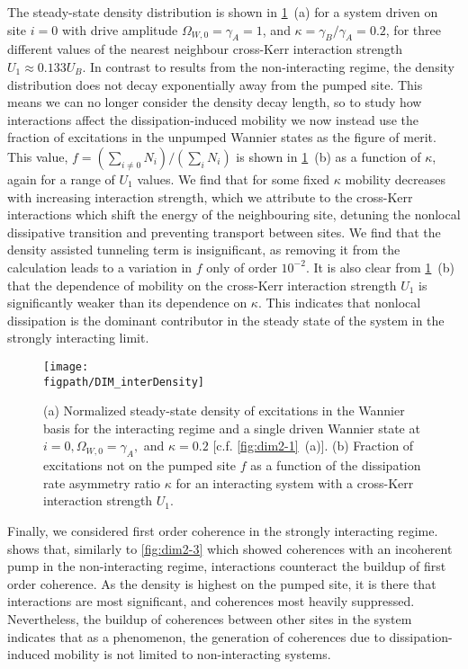 The steady-state density distribution is shown in \cref{fig:dim3-2}~(a) for a system driven on site \(i=0\) with drive amplitude \(\Omega_{W,0} = \gamma_{A} = 1\), and \(\kappa = \gamma_{B}/\gamma_{A} = 0.2\), for three different values of the nearest neighbour cross-Kerr interaction strength \(U_{1} \approx 0.133U_{B}\). In contrast to results from the non-interacting regime, the density distribution does not decay exponentially away from the pumped site. This means we can no longer consider the density decay length, so to study how interactions affect the dissipation-induced mobility we now instead use the fraction of excitations in the unpumped Wannier states as the figure of merit. This value, \(f = (\sum_{i \neq 0} N_{i}) / (\sum_{i} N_{i})\) is shown in \cref{fig:dim3-2}~(b) as a function of \(\kappa\), again for a range of \(U_{1}\) values. We find that for some fixed \(\kappa\) mobility decreases with increasing interaction strength, which we attribute to the cross-Kerr interactions which shift the energy of the neighbouring site, detuning the nonlocal dissipative transition and preventing transport between sites. We find that the density assisted tunneling term is insignificant, as removing it from the calculation leads to a variation in \(f\) only of order \(10^{-2}\). It is also clear from \cref{fig:dim3-2}~(b) that the dependence of mobility on the cross-Kerr interaction strength \(U_{1}\) is significantly weaker than its dependence on \(\kappa\). This indicates that nonlocal dissipation is the dominant contributor in the steady state of the system in the strongly interacting limit.

\begin{figure}[ht!]
\centering
\texttt{[image: \\figpath/DIM\_interDensity]}
\caption{\label{fig:dim3-2}(a) Normalized steady-state density of excitations in the Wannier basis for the interacting regime and a single driven Wannier state at \(i=0, \Omega_{W,0} = \gamma_{A},\) and \(\kappa = 0.2\) [c.f. \cref{fig:dim2-1}~(a)]. (b) Fraction of excitations not on the pumped site \(f\) as a function of the dissipation rate asymmetry ratio \(\kappa\) for an interacting system with a cross-Kerr interaction strength \(U_{1}\).}
\end{figure}

Finally, we considered first order coherence in the strongly interacting regime.  shows that, similarly to \cref{fig:dim2-3} which showed coherences with an incoherent pump in the non-interacting regime, interactions counteract the buildup of first order coherence. As the density is highest on the pumped site, it is there that interactions are most significant, and coherences most heavily suppressed. Nevertheless, the buildup of coherences between other sites in the system indicates that as a phenomenon, the generation of coherences due to dissipation-induced mobility is not limited to non-interacting systems.

